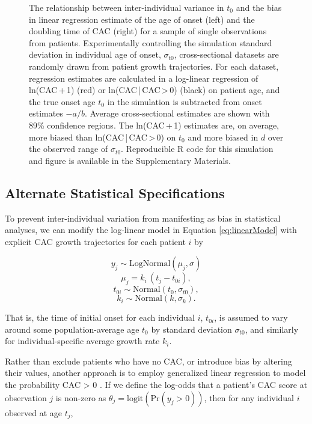 \documentclass[a4paper, 10pt]{article}
\begin{document}
\begin{figure}[t]
  \centering
  
  \caption{The relationship between inter-individual variance in $t_0$ and the bias in linear regression estimate of the age of onset (left) and the doubling time of CAC (right) for a sample of single observations from \biasNumPatients{} patients. Experimentally controlling the simulation standard deviation in individual age of onset, $\sigma_{t0}$, \biasNumSamples{} cross-sectional datasets are randomly drawn from \biasNumPatients{} patient growth trajectories. For each dataset, regression estimates are calculated in a log-linear regression of ln(CAC\,+\,1) (red) or ln(CAC\,|\,CAC\,>\,0) (black) on patient age, and the true onset age $t_0$ in the simulation is subtracted from onset estimates $-a/b$. Average cross-sectional estimates are shown with 89\% confidence regions. The ln(CAC\,+\,1) estimates are, on average, \biasDiffOnset{} more biased than ln(CAC\,|\,CAC\,>\,0) on $t_0$ and \biasDiffDoubling{} more biased in $d$ over the observed range of $\sigma_{t0}$. Reproducible R code for this simulation and figure is available in the Supplementary Materials.}
  \label{fig:varianceBias}
\end{figure}

\subsection{Alternate Statistical Specifications}

To prevent inter-individual variation from manifesting as bias in statistical analyses, we can modify the log-linear model in Equation \ref{eq:linearModel} with explicit CAC growth trajectories for each patient $i$ by

$$
  y_j \sim \mathrm{LogNormal}(\mu_j, \sigma)
$$
\begin{equation}
  \label{eq:multiLinearModel}
  \mu_j = k_i\,(t_j - t_{0i}),
\end{equation}
$$
  t_{0i} \sim \mathrm{Normal}(t_0, \sigma_{t0}),
$$
$$
  k_i \sim \mathrm{Normal}(k, \sigma_{k}).
$$

That is, the time of initial onset for each individual $i$, $t_{0i}$, is assumed to vary around some population-average age $t_0$ by standard deviation $\sigma_{t0}$, and similarly for individual-specific average growth rate $k_i$.

Rather than exclude patients who have no CAC, or introduce bias by altering their values, another approach is to employ generalized linear regression to model the probability CAC > 0 \cite{vliegenthart2002rotterdam, kondos2003events, taylor2005premature, vliegenthart2005elderly, schmermund2006heinz, santos2006international, nasir2007mortality, lakoski2007lowriskwomen, budoff2007long, lutsey2008acculturation,okwuosa2011lowrisk, yu2013korean, aboyans2011peripheral, whelton2015predictors}. If we define the log-odds that a patient's CAC score at observation $j$ is non-zero as $\theta_j = \mathrm{logit}(\mathrm{Pr}(y_j > 0))$, then for any individual $i$ observed at age $t_j$,
\end{document}
